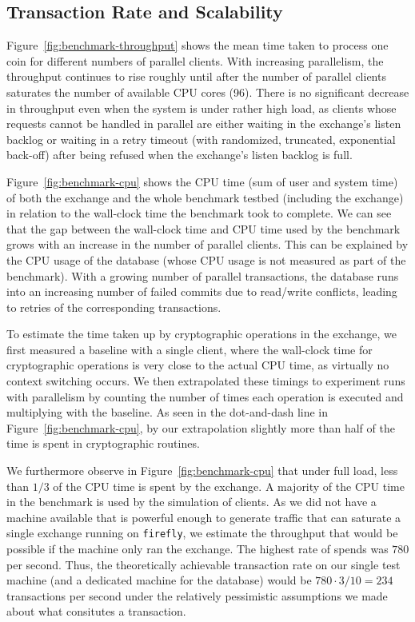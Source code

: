 \subsection{Transaction Rate and Scalability}
Figure~\ref{fig:benchmark-throughput} shows the mean time taken to process one
coin for different numbers of parallel clients.  With increasing parallelism,
the throughput continues to rise roughly until after the number of parallel
clients saturates the number of available CPU cores (96).  There is no
significant decrease in throughput even when the system is under rather high
load, as clients whose requests cannot be handled in parallel are either
waiting in the exchange's listen backlog or waiting in a retry timeout
(with randomized, truncated, exponential back-off) after being refused when the
exchange's listen backlog is full.


Figure~\ref{fig:benchmark-cpu} shows the CPU time (sum of user and system time)
of both the exchange and the whole benchmark testbed (including the exchange)
in relation to the wall-clock time the benchmark took to complete.
We can see that the gap between the wall-clock time and CPU time used by the
benchmark grows with an increase in the number of parallel clients.  This can
be explained by the CPU usage of the database (whose CPU usage is not measured
as part of the benchmark).  With a growing number of parallel transactions, the
database runs into an increasing number of failed commits due to read/write
conflicts, leading to retries of the corresponding transactions.

To estimate the time taken up by cryptographic operations in the exchange, we
first measured a baseline with a single client, where the wall-clock time for
cryptographic operations is very close to the actual CPU time, as virtually no
context switching occurs.  We then extrapolated these timings to experiment
runs with parallelism by counting the number of times each operation is
executed and multiplying with the baseline.  As seen in the dot-and-dash line
in Figure~\ref{fig:benchmark-cpu}, by our extrapolation slightly more than half
of the time is spent in cryptographic routines.

We furthermore observe in Figure~\ref{fig:benchmark-cpu} that under full load,
less than $1/3$ of the CPU time is spent by the exchange.  A majority of the
CPU time in the benchmark is used by the simulation of clients.
As we did not have a machine available that is powerful enough to generate
traffic that can saturate a single exchange running on \texttt{firefly}, we
estimate the throughput that would be possible if the machine only ran the
exchange.  The highest rate of spends was $780$ per second.  Thus, the
theoretically achievable transaction rate on our single test machine (and a
dedicated machine for the database) would be $780 \cdot 3 / 10 = 234$ transactions
per second under the relatively pessimistic assumptions we made about what
consitutes a transaction.

